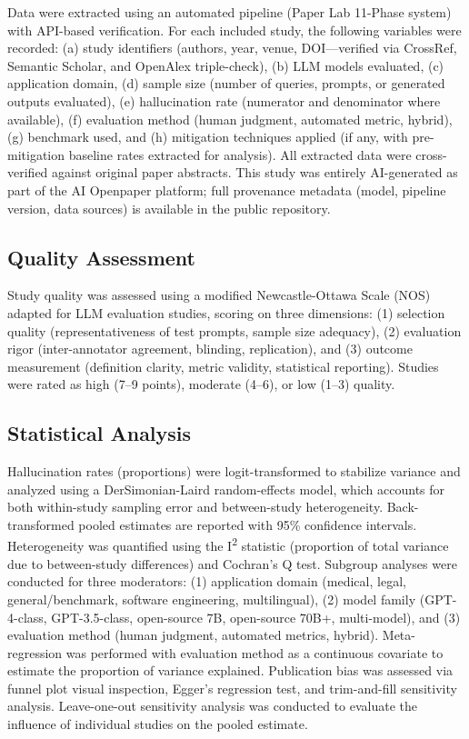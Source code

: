 \documentclass[
  11pt,
  a4paper,
]{article}
\begin{document}
Data were extracted using an automated pipeline (Paper Lab 11-Phase
system) with API-based verification. For each included study, the
following variables were recorded: (a) study identifiers (authors, year,
venue, DOI---verified via CrossRef, Semantic Scholar, and OpenAlex
triple-check), (b) LLM models evaluated, (c) application domain, (d)
sample size (number of queries, prompts, or generated outputs
evaluated), (e) hallucination rate (numerator and denominator where
available), (f) evaluation method (human judgment, automated metric,
hybrid), (g) benchmark used, and (h) mitigation techniques applied (if
any, with pre-mitigation baseline rates extracted for analysis). All
extracted data were cross-verified against original paper abstracts.
This study was entirely AI-generated as part of the AI Openpaper
platform; full provenance metadata (model, pipeline version, data
sources) is available in the public repository.

\subsection{Quality Assessment}\label{quality-assessment}

Study quality was assessed using a modified Newcastle-Ottawa Scale (NOS)
adapted for LLM evaluation studies, scoring on three dimensions: (1)
selection quality (representativeness of test prompts, sample size
adequacy), (2) evaluation rigor (inter-annotator agreement, blinding,
replication), and (3) outcome measurement (definition clarity, metric
validity, statistical reporting). Studies were rated as high (7--9
points), moderate (4--6), or low (1--3) quality.

\subsection{Statistical Analysis}\label{statistical-analysis}

Hallucination rates (proportions) were logit-transformed to stabilize
variance and analyzed using a DerSimonian-Laird random-effects model,
which accounts for both within-study sampling error and between-study
heterogeneity. Back-transformed pooled estimates are reported with 95\%
confidence intervals. Heterogeneity was quantified using the
I\textsuperscript{2} statistic (proportion of total variance due to
between-study differences) and Cochran's Q test. Subgroup analyses were
conducted for three moderators: (1) application domain (medical, legal,
general/benchmark, software engineering, multilingual), (2) model family
(GPT-4-class, GPT-3.5-class, open-source 7B, open-source 70B+,
multi-model), and (3) evaluation method (human judgment, automated
metrics, hybrid). Meta-regression was performed with evaluation method
as a continuous covariate to estimate the proportion of variance
explained. Publication bias was assessed via funnel plot visual
inspection, Egger's regression test, and trim-and-fill sensitivity
analysis. Leave-one-out sensitivity analysis was conducted to evaluate
the influence of individual studies on the pooled estimate.
\end{document}
